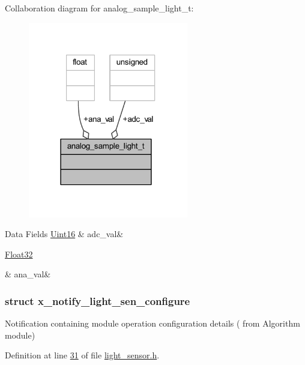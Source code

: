 Collaboration diagram for analog\+\_\+sample\+\_\+light\+\_\+t\+:\nopagebreak
\begin{figure}[H]
\begin{center}
\leavevmode
\includegraphics[width=198pt]{dc/d2b/a00936}
\end{center}
\end{figure}
\begin{DoxyFields}{Data Fields}
\hypertarget{a00018_a891d4fcb12960785cecc1e688681b748}{\hyperlink{a00072_a59a9f6be4562c327cbfb4f7e8e18f08b}{Uint16}}\label{a00018_a891d4fcb12960785cecc1e688681b748}
&
adc\+\_\+val&
\\
\hline

\hypertarget{a00018_a053a8ae0e59f7414929cd8ac3feeec7b}{\hyperlink{a00072_a87d38f886e617ced2698fc55afa07637}{Float32}}\label{a00018_a053a8ae0e59f7414929cd8ac3feeec7b}
&
ana\+\_\+val&
\\
\hline

\end{DoxyFields}
\label{da/de3/a00856}
\hypertarget{a00018_da/de3/a00856}{}
\subsubsection{struct x\+\_\+notify\+\_\+light\+\_\+sen\+\_\+configure}
Notification containing module operation configuration details ( from Algorithm module) 

Definition at line \hyperlink{a00018_source_l00031}{31} of file \hyperlink{a00018_source}{light\+\_\+sensor.\+h}.



